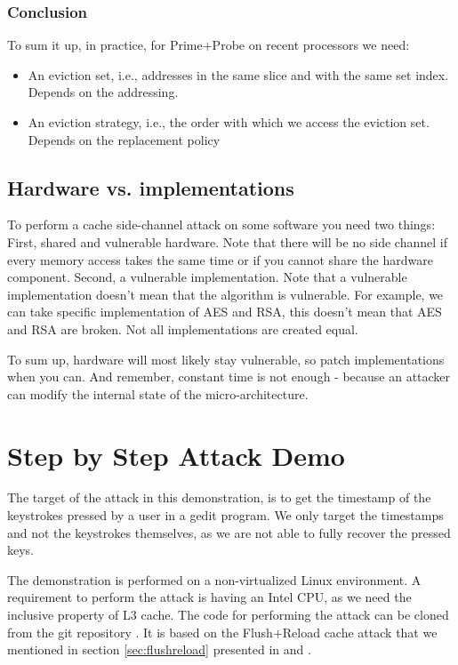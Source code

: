 \subsubsection{Conclusion}
To sum it up, in practice, for Prime+Probe on recent processors we need:
\begin{itemize}
    \item An eviction set, i.e., addresses in the same slice and with the same set index. Depends on the addressing.
    \item An eviction strategy, i.e., the order with which we access the eviction set. Depends on the replacement policy
\end{itemize}

\subsection{Hardware vs. implementations}
To perform a cache side-channel attack on some software you need two things: First, shared and vulnerable hardware. Note that there will be no side channel if every memory access takes the same time or if you cannot share the hardware component. Second, a vulnerable implementation. Note that a vulnerable implementation doesn't mean that the algorithm is vulnerable. For example, we can take specific implementation of AES and RSA, this doesn't mean that AES and RSA are broken. Not all implementations are created equal.

To sum up, hardware will most likely stay vulnerable, so patch implementations when you can. And remember, constant time is not enough - because an attacker can modify the internal state of the micro-architecture.
\section{Step by Step Attack Demo}\label{stepbystepattack:sec}

The target of the attack in this demonstration, is to get the timestamp of the keystrokes pressed by a user in a gedit program. We only target the timestamps and not the keystrokes themselves, as we are not able to fully recover the pressed keys.

The demonstration is performed on a non-virtualized Linux environment. A requirement to perform the attack is having an Intel CPU, as we need the inclusive property of L3 cache. The code for performing the attack can be cloned from the git repository \cite{GitClementine}. It is based on the Flush+Reload cache attack that we mentioned in section \ref{sec:flushreload} presented in \cite{Yarom2014} and \cite{Gruss2015}.

